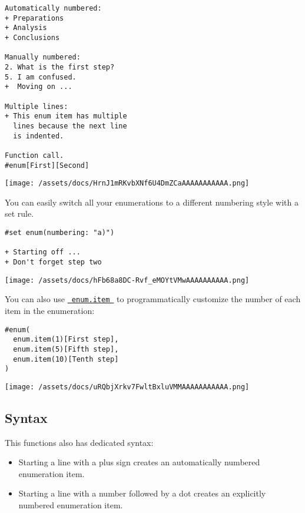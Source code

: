 \begin{verbatim}
Automatically numbered:
+ Preparations
+ Analysis
+ Conclusions

Manually numbered:
2. What is the first step?
5. I am confused.
+  Moving on ...

Multiple lines:
+ This enum item has multiple
  lines because the next line
  is indented.

Function call.
#enum[First][Second]
\end{verbatim}

\texttt{[image: /assets/docs/HrnJ1mRKvbXNf6U4DmZCaAAAAAAAAAAA.png]}

You can easily switch all your enumerations to a different numbering
style with a set rule.

\begin{verbatim}
#set enum(numbering: "a)")

+ Starting off ...
+ Don't forget step two
\end{verbatim}

\texttt{[image: /assets/docs/hFb68a8DC-Rvf\_eMOYtVMwAAAAAAAAAA.png]}

You can also use
\href{/docs/reference/model/enum/\#definitions-item}{\texttt{\ enum.item\ }}
to programmatically customize the number of each item in the
enumeration:

\begin{verbatim}
#enum(
  enum.item(1)[First step],
  enum.item(5)[Fifth step],
  enum.item(10)[Tenth step]
)
\end{verbatim}

\texttt{[image: /assets/docs/uRQbjXrkv7FwltBxluVMMAAAAAAAAAAA.png]}

\subsection{Syntax}\label{syntax}

This functions also has dedicated syntax:

\begin{itemize}
\tightlist
\item
  Starting a line with a plus sign creates an automatically numbered
  enumeration item.
\item
  Starting a line with a number followed by a dot creates an explicitly
  numbered enumeration item.
\end{itemize}

